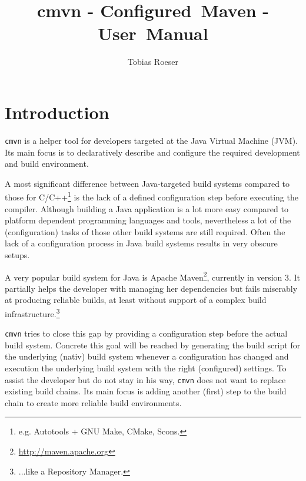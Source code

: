 \documentclass[a4paper,11pt,english,oneside,halfparskip]{scrartcl}
\title{cmvn - Configured~Maven - User~Manual}
\author{Tobias Roeser}
\newcommand{\CMVN}{\texttt{cmvn}}
\newcommand{\VERSION}{0.1.0}
\begin{document}
\renewcommand{\labelitemi}{$\triangleright$}

\maketitle

% 

\clearpage

\ifpdf{}\fi
\tableofcontents

\clearpage

\section{Introduction}

\CMVN{} is a helper tool for developers targeted at the Java Virtual Machine (JVM). Its main focus is to declaratively describe and configure the required development and build environment. 

A most significant difference between Java-targeted build systems compared to those for C/C++\footnote{e.g. Autotools + GNU Make, CMake, Scons.} is the lack of a defined configuration step before executing the compiler. Although building a Java application is a lot more easy compared to platform dependent programming languages and tools, nevertheless a lot of the (configuration) tasks of those other build systems are still required. Often the lack of a configuration process in Java build systems results in very obscure setups.

A very popular build system for Java is Apache Maven\footnote{\url{http://maven.apache.org}}, currently in version 3. It partially helps the developer with managing her dependencies but fails miserably at producing reliable builds, at least without support of a complex build infrastructure.\footnote{...like a Repository Manager.}

\CMVN{} tries to close this gap by providing a configuration step before the actual build system. Concrete this goal will be reached by generating the build script for the underlying (nativ) build system whenever a configuration has changed and execution the underlying build system with the right (configured) settings.
To assist the developer but do not stay in his way, \CMVN{} does not want to replace existing build chains. Its main focus is adding another (first) step to the build chain to create more reliable build environments.
\end{document}
